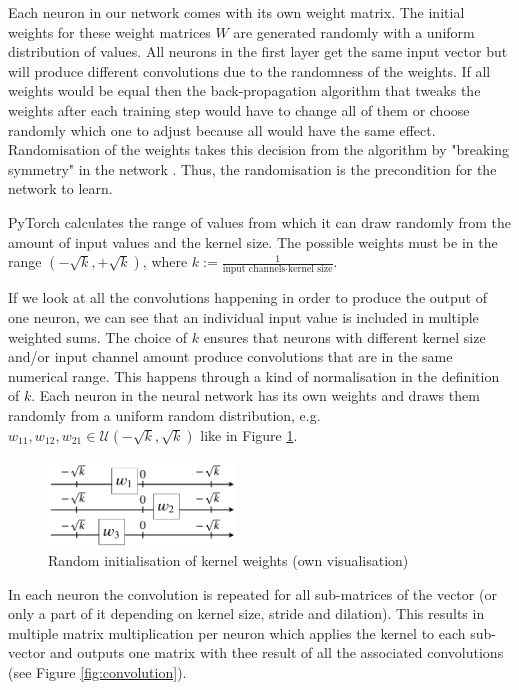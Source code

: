 \documentclass{article}
\begin{document}
Each neuron in our network comes with its own weight matrix. The initial weights for these weight matrices $W$ are generated randomly with a uniform distribution of values. All neurons in the first layer get the same input vector but will produce different convolutions due to the randomness of the weights.
If all weights would be equal then the back-propagation algorithm that tweaks the weights after each training step would have to change all of them or choose randomly which one to adjust because all would have the same effect. Randomisation of the weights takes this decision from the algorithm by "breaking symmetry" in the network \cite[p.~297]{Goodfellow-et-al-2016}. Thus, the randomisation is the precondition for the network to learn.

PyTorch calculates the range of values from which it can draw randomly from the amount of input values and the kernel size.
The possible weights must be in the range $(-\sqrt{k},+\sqrt{k})$, where $k:=\frac{1}{\text{input channels}\cdot\text{kernel size}}$.

If we look at all the convolutions happening in order to produce the output of one neuron, we can see that an individual input value is included in multiple weighted sums.
The choice of $k$ ensures that neurons with different kernel size and/or input channel amount produce convolutions that are in the same numerical range. This happens through a kind of normalisation in the definition of $k$.
Each neuron in the neural network has its own weights and draws them randomly from a uniform random distribution, e.g. $w_{11},w_{12},w_{21} \in\mathcal{U}(-\sqrt{k},\sqrt{k})$ like in Figure \ref{fig:initweights}.
\begin{figure}[ht]
    \begin{center}
        \includegraphics[width=5cm,keepaspectratio]{writing/01_midterm-report-latex/figures/intialization.pdf}
        \caption{Random initialisation of kernel weights (own visualisation)}
        \label{fig:initweights}
    \end{center}
\end{figure}


In each neuron the convolution is repeated for all sub-matrices of the vector (or only a part of it depending on kernel size, stride and dilation). This results in multiple matrix multiplication per neuron which applies the kernel to each sub-vector and outputs one matrix with thee result of all the associated convolutions (see Figure \ref{fig:convolution}).
\end{document}

